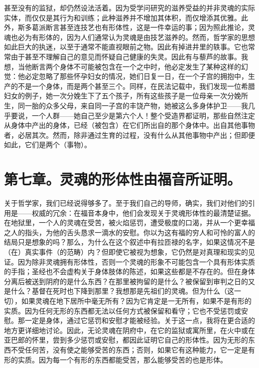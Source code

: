 甚至没有的监狱，却仍然设法活着。因为受学问研究的滋养受益的并非灵魂的实际实体，而仅仅是其行为和训练；此种滋养并不增加其体积，而仅增添其优雅。此外，斯多葛派断言甚至连技艺也有形体性，这是一件幸运的事；因为照此推论，灵魂也必为有形体的，因为人们通常认为灵魂是由技艺滋养的。然而，哲学家的思想如此巨大的执迷，以至于通常不能直视眼前之物。因此有掉进井里的轶事。它也常常由于甚至不理解自己的意见而怀疑自己健康的失灵。因此有与藜芦的故事。我想，当他断言两个身体不可能被包含在一个之中时，他必定发生了某种这样的幻觉：他必定忽略了那些怀孕妇女的情况，她们日复一日，在一个子宫的拥抱中，生产的不是一个身体，而是两个甚至三个。同样，在民法记载中，我们发现一位希腊妇女的例子，她一次分娩生下了五个孩子，所有这些孩子是一位母亲一次分娩所生，同一胎的众多父母，来自同一子宫的丰饶产物，她被这么多身体护卫——我几乎要说，一个人群——她自己至少是第六个人！整个受造界都证明，那些自然注定从身体中产出的身体，已经（被包含）在它们所出自的那个身体中。出自其他事物者，必居其次。然而，除非通过生育的过程，没有什么从其他事物中产出；但即便如此，它们是两个（事物）。\par


\section{第七章。灵魂的形体性由福音所证明。}

关于哲学家，我们已经说得够多了。至于我们自己的导师，确实，我们对他们的引用是——权威的冗余：在福音本身中，他们会发现关于灵魂形体性的最清楚证据。在地狱里，一个人的灵魂在受苦，被火焰惩罚，遭受极度的口渴，并从一个更幸福之人的指头，为他的舌头恳求一滴水的安慰。你以为这有福的穷人和可怜的富人的结局只是想象的吗？那么，为什么在这个叙述中有拉匝禄的名字，如果这情况不是（在）真实事件（的范畴）内？但即使它被视为想象，它仍然是对真理和现实的见证。因为除非灵魂拥有形体性，否则一个灵魂的形象不可能包含一个具有形体实质的手指；圣经也不会虚构关于身体肢体的陈述，如果这些都是不存在的。但在身体分离后被送到阴府的是什么东西？在那里被拘留的是什么？被保留到审判之日的又是什么？基督在死时也下降到那里？我想那是先祖们的灵魂。但为什么（这一切），如果灵魂在地下居所中毫无所有？因为它肯定是一无所有，如果不是有形的实质。因为任何无形的东西都无法以任何方式被保留和看守；它也不受惩罚或安慰。那一定是身体，通过它惩罚和安慰才能被经验。关于这一点，我将在更合适的地方更详细地讨论。因此，无论灵魂在阴府中，在它的监狱或寓所里，在火中或在亚巴郎的怀里，尝到多少惩罚或安慰，都因此证明它自己的形体性。因为无形的东西不受任何苦，没有使之能够受苦的东西；否则，如果它有这种能力，它一定是有形的实质。因为每一个有形的东西都能受苦，那么能够受苦的也是形体。\par

